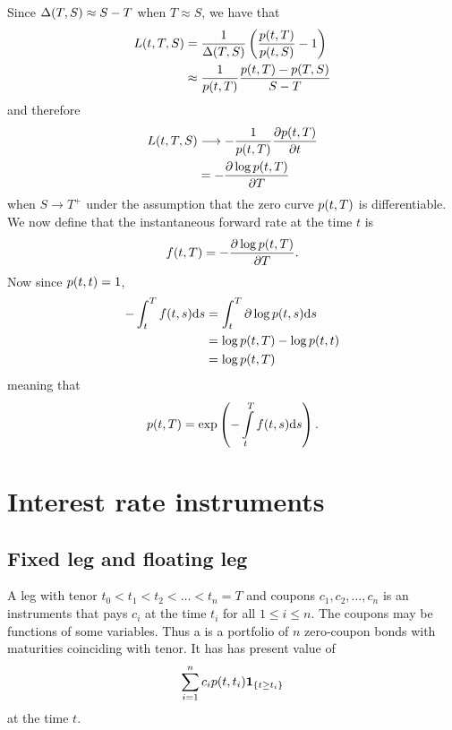 Since $\Delta(T,S) \approx S-T$ when $T \approx S$, we have that 
	\begin{align}
		L(t,T,S) &= \frac{1}{\Delta(T,S)} \left( \frac{p(t,T)}{p(t,S)} - 1 \right) \\
				   &\approx \frac{1}{p(t,T)} \frac{p(t,T) - p(T,S)}{S-T}
	\end{align}
and therefore
	\begin{align}
		L(t,T,S) & \longrightarrow - \frac{1}{p(t,T)} \frac{ \partial p(t,T) }{ \partial t} \\
			&= - \frac{\partial \log p(t,T)}{\partial T}
	\end{align}
when $S \rightarrow T^+$ under the assumption that the zero curve $p(t,T)$ is differentiable. We now define that the instantaneous forward rate at the time $t$ is
	\begin{align}
		f(t,T) = - \frac{\partial \log p(t,T)}{\partial T}.
	\end{align}
Now since $p(t,t) = 1$,
	\begin{align}
		- \int_t^T f(t,s) \mathrm{d} s &= \int_t^T \partial \log p(t,s) \mathrm{d} s \\
			&=  \log p(t,T) - \log p(t,t) \\ &= \log p(t,T)
	\end{align}	
meaning that
	\begin{align}
		p(t,T) = \exp \left( - \int\limits_t^T f (t,s) \mathrm{d} s \right) .
	\end{align}
	
\section{Interest rate instruments}		

\subsection{Fixed leg and floating leg}

A leg with tenor $t_0 < t_1 < t_2 < \ldots < t_n = T$ and coupons $c_1, c_2, \ldots, c_n$ is an instruments that pays $c_i$ at the time $t_i$ for all $1 \leq i \leq n$. The coupons may be functions of some variables. Thus a is a portfolio of $n$ zero-coupon bonds with maturities coinciding with tenor. It has has present value of
  \begin{align}
    \sum_{i=1}^n c_i p (t, t_i) \boldsymbol{1}_{ \{ t \geq t_i \} } 
  \end{align}
at the time $t$. 

